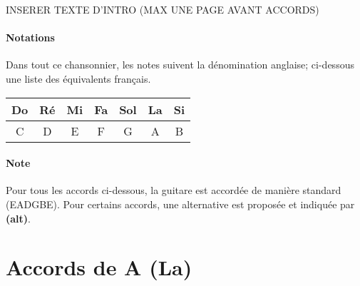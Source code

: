
INSERER TEXTE D'INTRO (MAX UNE PAGE AVANT ACCORDS)
\paragraph{Notations} Dans tout ce chansonnier, les notes suivent la dénomination anglaise; ci-dessous une liste des équivalents français.
\newline\newline
\begin{tabular}{||c||c||c||c||c||c||c||}
    \hline
    Do & Ré & Mi & Fa & Sol & La & Si\\
    \hline
    C & D & E & F & G & A & B\\
    \hline
\end{tabular}
\vfill
\paragraph{Note} Pour tous les accords ci-dessous, la guitare est accordée de manière standard (EADGBE).\newline
Pour certains accords, une alternative est proposée et indiquée par \textbf{(alt)}.

\newpage
\section{Accords de A (La)}
\makebox[0.1\textwidth][c]{\usebox{\A}}
\makebox[0.084\textwidth][c]{\usebox{\Aalt}}
\makebox[0.04\textwidth][c]{}
\makebox[0.1\textwidth][c]{\usebox{\Am}}
\makebox[0.084\textwidth][c]{\usebox{\Amalt}}
\makebox[0.04\textwidth][c]{}
\makebox[0.1\textwidth][c]{\usebox{\Afive}}
\makebox[0.04\textwidth][c]{}
\makebox[0.1\textwidth][c]{\usebox{\Aseven}}
\makebox[0.01\textwidth][c]{}
\makebox[0.084\textwidth][c]{\usebox{\Asevenalt}}\newline
\makebox[0.1\textwidth][c]{\usebox{\Amajseven}}
\makebox[0.084\textwidth][c]{\usebox{\Amajsevenalt}}
\makebox[0.04\textwidth][c]{}
\makebox[0.1\textwidth][c]{\usebox{\Amseven}}
\makebox[0.084\textwidth][c]{\usebox{\Amsevenalt}}
\makebox[0.04\textwidth][c]{}
\makebox[0.1\textwidth][c]{\usebox{\Asusfour}}
\makebox[0.084\textwidth][c]{\usebox{\Asusfouralt}}
\makebox[0.04\textwidth][c]{}
\makebox[0.01\textwidth][c]{}
\makebox[0.084\textwidth][c]{\usebox{\Aaddnine}}\newline
\makebox[0.1\textwidth][c]{\usebox{\Asustwo}}
\makebox[0.04\textwidth][c]{}
\makebox[0.1\textwidth][c]{\usebox{\Asevensusfour}}
\makebox[0.084\textwidth][c]{\usebox{\Asevensusfouralt}}
\makebox[0.04\textwidth][c]{}
\makebox[0.01\textwidth][c]{}
\makebox[0.084\textwidth][c]{\usebox{\Asevensharpnine}}
\makebox[0.04\textwidth][c]{}
\makebox[0.01\textwidth][c]{}
\makebox[0.084\textwidth][c]{\usebox{\Anine}}

